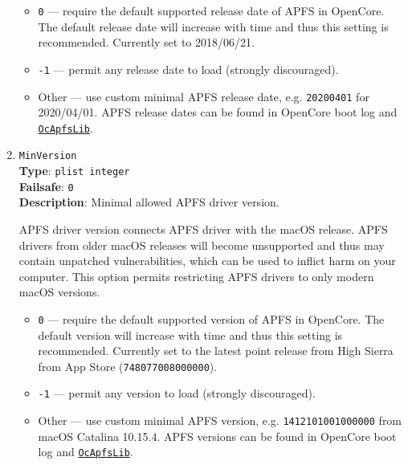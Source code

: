 \documentclass[]{article}
\providecommand{\tightlist}{%
  \setlength{\itemsep}{0pt}\setlength{\parskip}{0pt}}
\begin{document}
\begin{enumerate}
  \begin{itemize}
    \tightlist
    \item \texttt{0} --- require the default supported release date of APFS
    in OpenCore. The default release date will increase with time and thus
    this setting is recommended. Currently set to 2018/06/21.
    \item \texttt{-1} --- permit any release date to load (strongly discouraged).
    \item Other --- use custom minimal APFS release date, e.g. \texttt{20200401}
    for 2020/04/01. APFS release dates can be found in OpenCore boot log
    and \href{https://github.com/acidanthera/OpenCorePkg/blob/master/Include/Library/OcApfsLib.h}{\texttt{OcApfsLib}}.
  \end{itemize}

\item
  \texttt{MinVersion}\\
  \textbf{Type}: \texttt{plist\ integer}\\
  \textbf{Failsafe}: \texttt{0}\\
  \textbf{Description}: Minimal allowed APFS driver version.

  APFS driver version connects APFS driver with the macOS
  release. APFS drivers from older macOS releases will become
  unsupported and thus may contain unpatched vulnerabilities, which
  can be used to inflict harm on your computer. This option permits
  restricting APFS drivers to only modern macOS versions.

  \begin{itemize}
    \tightlist
    \item \texttt{0} --- require the default supported version of APFS
    in OpenCore. The default version will increase with time and thus
    this setting is recommended. Currently set to the latest point release
    from High Sierra from App Store (\texttt{748077008000000}).
    \item \texttt{-1} --- permit any version to load (strongly discouraged).
    \item Other --- use custom minimal APFS version, e.g. \texttt{1412101001000000}
    from macOS Catalina 10.15.4. APFS versions can be found in OpenCore boot log
    and \href{https://github.com/acidanthera/OpenCorePkg/blob/master/Include/Library/OcApfsLib.h}{\texttt{OcApfsLib}}.
  \end{itemize}

\end{enumerate}
\end{document}
